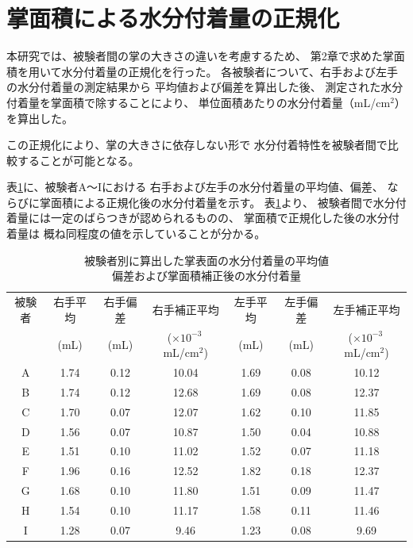 
\section{掌面積による水分付着量の正規化}
本研究では、被験者間の掌の大きさの違いを考慮するため、
第2章で求めた掌面積を用いて水分付着量の正規化を行った。
各被験者について、右手および左手の水分付着量の測定結果から
平均値および偏差を算出した後、
測定された水分付着量を掌面積で除することにより、
単位面積あたりの水分付着量（mL/cm$^2$）を算出した。

この正規化により、掌の大きさに依存しない形で
水分付着特性を被験者間で比較することが可能となる。

表\ref{tab:water_all_subjects}に、被験者A〜Iにおける
右手および左手の水分付着量の平均値、偏差、
ならびに掌面積による正規化後の水分付着量を示す。
表\ref{tab:water_all_subjects}より、
被験者間で水分付着量には一定のばらつきが認められるものの、
掌面積で正規化した後の水分付着量は
概ね同程度の値を示していることが分かる。

\vspace{2mm}

\begin{table}[htbp]
  \centering
  \caption{被験者別に算出した掌表面の水分付着量の平均値\\偏差および掌面積補正後の水分付着量}
  \label{tab:water_all_subjects}
  \small
  \begin{tabular}{c c c c c c c}
    \hline
    被験者 &
    右手平均 &
    右手偏差 &
    右手補正平均 &
    左手平均 &
    左手偏差 &
    左手補正平均 \\
     &
    (mL) &
    (mL) &
    ($\times 10^{-3}$\,mL/cm$^2$) &
    (mL) &
    (mL) &
    ($\times 10^{-3}$\,mL/cm$^2$) \\
    \hline
    A & 1.74 & 0.12 & 10.04 & 1.69 & 0.08 & 10.12 \\
    B & 1.74 & 0.12 & 12.68 & 1.69 & 0.08 & 12.37 \\
    C & 1.70 & 0.07 & 12.07 & 1.62 & 0.10 & 11.85 \\
    D & 1.56 & 0.07 & 10.87 & 1.50 & 0.04 & 10.88 \\
    E & 1.51 & 0.10 & 11.02 & 1.52 & 0.07 & 11.18 \\
    F & 1.96 & 0.16 & 12.52 & 1.82 & 0.18 & 12.37 \\
    G & 1.68 & 0.10 & 11.80 & 1.51 & 0.09 & 11.47 \\
    H & 1.54 & 0.10 & 11.17 & 1.58 & 0.11 & 11.46 \\
    I & 1.28 & 0.07 & 9.46  & 1.23 & 0.08 & 9.69  \\
    \hline
  \end{tabular}
\end{table}



